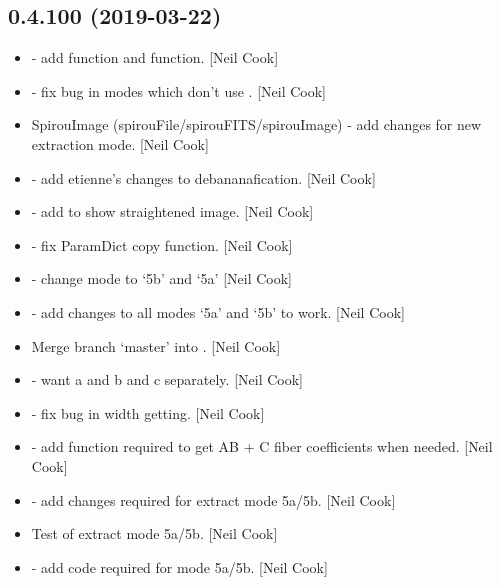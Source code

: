 \documentclass[a4paper,10pt,english]{report}
\begin{document}
\subsection{0.4.100 (2019-03-22)}
\label{\detokenize{misc/changelog:id160}}\begin{itemize}
\item {} 
 - add  function and
 function. {[}Neil Cook{]}

\item {} 
 - fix bug in modes which don’t use . {[}Neil Cook{]}

\item {} 
SpirouImage (spirouFile/spirouFITS/spirouImage) - add changes for new
extraction mode. {[}Neil Cook{]}

\item {} 
 - add etienne’s changes to debananafication. {[}Neil
Cook{]}

\item {} 
 - add  to show straightened image.
{[}Neil Cook{]}

\item {} 
 - fix ParamDict copy function. {[}Neil Cook{]}

\item {} 
 - change mode to ‘5b’ and ‘5a’ {[}Neil Cook{]}

\item {} 
 - add changes to all modes ‘5a’ and ‘5b’ to
work. {[}Neil Cook{]}

\item {} 
Merge branch ‘master’ into . {[}Neil Cook{]}

\item {} 
 - want a and b and c separately. {[}Neil Cook{]}

\item {} 
 - fix bug in width getting. {[}Neil Cook{]}

\item {} 
 - add function required to get AB + C fiber
coefficients when needed. {[}Neil Cook{]}

\item {} 
 - add changes required for extract mode 5a/5b. {[}Neil
Cook{]}

\item {} 
Test of extract mode 5a/5b. {[}Neil Cook{]}

\item {} 
 - add code required for mode 5a/5b. {[}Neil
Cook{]}

\end{itemize}
\end{document}
